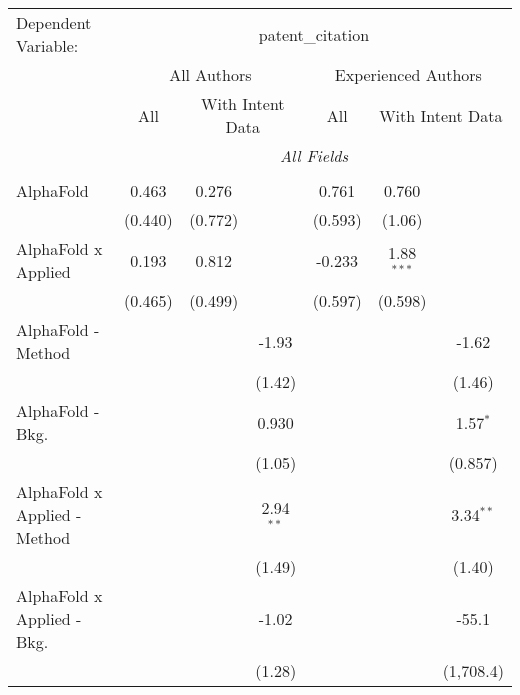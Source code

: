 \begingroup
\centering
\begin{tabular}{lcccccc}
   \tabularnewline \midrule \midrule
   Dependent Variable: & \multicolumn{6}{c}{patent\_citation}\\
 & \multicolumn{3}{c}{All Authors} & \multicolumn{3}{c}{Experienced Authors} \\
\cmidrule(lr){2-4} \cmidrule(lr){5-7}
 & \multicolumn{1}{c}{All} & \multicolumn{2}{c}{With Intent Data} & \multicolumn{1}{c}{All} & \multicolumn{2}{c}{With Intent Data} \\
\cmidrule(lr){2-2} \cmidrule(lr){3-4} \cmidrule(lr){5-5} \cmidrule(lr){6-7}
 & \multicolumn{6}{c}{\textit{All Fields}} \\ \\
   AlphaFold                      & 0.463          & 0.276      &               & 0.761          & 0.760        &   \\   
                                  & (0.440)        & (0.772)    &               & (0.593)        & (1.06)       &   \\   
   AlphaFold x Applied            & 0.193          & 0.812      &               & -0.233         & 1.88$^{***}$ &   \\   
                                  & (0.465)        & (0.499)    &               & (0.597)        & (0.598)      &   \\   
   AlphaFold - Method             &                &            & -1.93         &                &              & -1.62\\   
                                  &                &            & (1.42)        &                &              & (1.46)\\   
   AlphaFold - Bkg.               &                &            & 0.930         &                &              & 1.57$^{*}$\\   
                                  &                &            & (1.05)        &                &              & (0.857)\\   
   AlphaFold x Applied - Method   &                &            & 2.94$^{**}$   &                &              & 3.34$^{**}$\\   
                                  &                &            & (1.49)        &                &              & (1.40)\\   
   AlphaFold x Applied - Bkg.     &                &            & -1.02         &                &              & -55.1\\   
                                  &                &            & (1.28)        &                &              & (1,708.4)\\   

\end{tabular}
